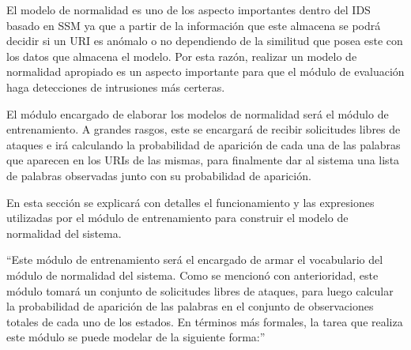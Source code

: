 El modelo de normalidad es uno de los aspecto importantes dentro del IDS basado en SSM ya que a partir de la información que este almacena se podrá decidir si un URI es anómalo o no dependiendo de la similitud que posea este con los datos que almacena el modelo. Por esta razón, realizar un modelo de normalidad apropiado es un aspecto  importante para que el módulo de evaluación haga detecciones de intrusiones más certeras.

El módulo encargado de elaborar los modelos de normalidad será el módulo de entrenamiento. A grandes rasgos, este se encargará de recibir solicitudes libres de ataques e irá calculando la probabilidad de aparición de cada una de las palabras que aparecen en los URIs de las mismas, para finalmente dar al sistema una lista de palabras observadas junto con su probabilidad de aparición.

En esta sección se explicará con detalles el funcionamiento y las expresiones utilizadas por el módulo de entrenamiento para construir el modelo de normalidad del sistema. 

``Este módulo de entrenamiento será el encargado de armar el vocabulario del módulo de normalidad del sistema. Como se mencionó con anterioridad, este módulo tomará un conjunto de solicitudes libres de ataques, para luego calcular la probabilidad de aparición de las palabras en el conjunto de observaciones totales de cada uno de los estados. En términos más formales, la  tarea que realiza este módulo se puede modelar de la siguiente forma:''